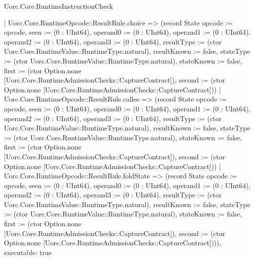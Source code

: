 \begin{lexlean}{Uorc.Core.RuntimeInstructionCheck}
\begin{semanticmodule}
{    | Uorc.Core.RuntimeOpcode::ResultRule.choice => (record State {opcode := opcode, seen := (0 : UInt64), operand0 := (0 : UInt64), operand1 := (0 : UInt64), operand2 := (0 : UInt64), operand3 := (0 : UInt64), resultType := (ctor Uorc.Core.RuntimeValue::RuntimeType.natural), resultKnown := false, stateType := (ctor Uorc.Core.RuntimeValue::RuntimeType.natural), stateKnown := false, first := (ctor Option.none [Uorc.Core.RuntimeAdmissionChecks::CaptureContract]), second := (ctor Option.none [Uorc.Core.RuntimeAdmissionChecks::CaptureContract])})
    | Uorc.Core.RuntimeOpcode::ResultRule.callee => (record State {opcode := opcode, seen := (0 : UInt64), operand0 := (0 : UInt64), operand1 := (0 : UInt64), operand2 := (0 : UInt64), operand3 := (0 : UInt64), resultType := (ctor Uorc.Core.RuntimeValue::RuntimeType.natural), resultKnown := false, stateType := (ctor Uorc.Core.RuntimeValue::RuntimeType.natural), stateKnown := false, first := (ctor Option.none [Uorc.Core.RuntimeAdmissionChecks::CaptureContract]), second := (ctor Option.none [Uorc.Core.RuntimeAdmissionChecks::CaptureContract])})
    | Uorc.Core.RuntimeOpcode::ResultRule.foldState => (record State {opcode := opcode, seen := (0 : UInt64), operand0 := (0 : UInt64), operand1 := (0 : UInt64), operand2 := (0 : UInt64), operand3 := (0 : UInt64), resultType := (ctor Uorc.Core.RuntimeValue::RuntimeType.natural), resultKnown := false, stateType := (ctor Uorc.Core.RuntimeValue::RuntimeType.natural), stateKnown := false, first := (ctor Option.none [Uorc.Core.RuntimeAdmissionChecks::CaptureContract]), second := (ctor Option.none [Uorc.Core.RuntimeAdmissionChecks::CaptureContract])})),
  executable: true
}


\end{semanticmodule}
\end{lexlean}
